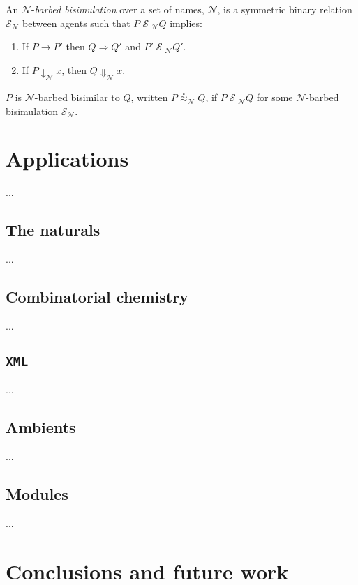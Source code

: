 \documentclass[]{entcs}
\newcommand{\red}{\rightarrow}
\newcommand{\wred}{\Rightarrow}
\newcommand{\rel}[1]{\;{\mathcal #1}\;} %
\newcommand{\wbbisim}{\stackrel{\centerdot}{\approx}} %
\begin{document}
\begin{definition}
An  ${\mathcal N}$-\emph{barbed bisimulation} over a set of names, ${\mathcal N}$, is a symmetric binary relation 
${\mathcal S}_{\mathcal N}$ between agents such that $P\rel{S}_{\mathcal N}Q$ implies:
\begin{enumerate}
\item If $P \red P'$ then $Q \wred Q'$ and $P'\rel{S}_{\mathcal N} Q'$.
\item If $P\downarrow_{\mathcal N} x$, then $Q\Downarrow_{\mathcal N} x$.
\end{enumerate}
$P$ is ${\mathcal N}$-barbed bisimilar to $Q$, written
$P \wbbisim_{\mathcal N} Q$, if $P \rel{S}_{\mathcal N} Q$ for some ${\mathcal N}$-barbed bisimulation ${\mathcal S}_{\mathcal N}$.
\end{definition}

\section{Applications}

...

\subsection{The naturals}

...

\subsection{Combinatorial chemistry}

...

\subsection{\texttt{XML}}

...

\subsection{Ambients}

...

\subsection{Modules}

...

\section{Conclusions and future work}
\end{document}
